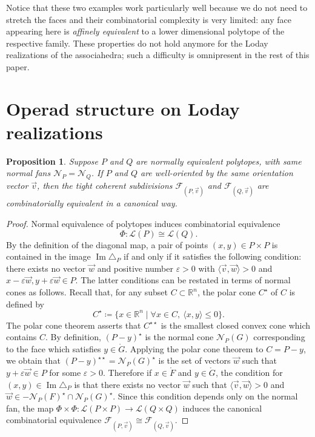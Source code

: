 \documentclass[JEP,XML,SOM,Unicode,NoFloatCountersInSection]{cedram}
\let\mathcal\mathscr
\theoremstyle{plain}
\newtheorem{proposition}{Proposition}
\theoremstyle{definition}
\newcommand{\RR}{\mathbb{R}}
\newcommand{\La}{\mathcal{L}}
\newcommand{\sF}{\mathcal{F}}
\newcommand{\ang}[1]{\langle #1\rangle}
\renewcommand{\No}{\mathcal{N}}
\DeclareMathOperator{\im}{\mathrm{Im}}
\begin{document}
Notice that these two examples work particularly well because we do not need to stretch the faces and their combinatorial complexity is very limited: any face appearing here is \emph{affinely equivalent} to a lower dimensional polytope of the respective family. These properties do not hold anymore for the Loday realizations of the associahedra; such a difficulty is omnipresent in the rest of this paper.

\section{Operad structure on Loday realizations}

\begin{proposition}\label{Prop:NormalFan}
Suppose $P$ and $Q$ are normally equivalent polytopes,
\ie with same normal fans $\No_P=\No_Q$.
If $P$ and $Q$ are well-oriented by the same orientation vector $\vec v$,
then the tight coherent subdivisions
$\sF_{(P, \vec v)}$ and $\sF_{(Q, \vec v)}$ are combinatorially equivalent in a canonical way.
\end{proposition}

\begin{proof}
Normal equivalence of polytopes induces combinatorial equivalence
\[
\Phi: \La(P)\cong\La(Q).
\]
By the definition of the diagonal map, a pair of points $(x, y)\in P\times P$ is contained in the image $\im \triangle_P$ if and only if it satisfies the following condition:
there exists no vector $\vec w$ and positive number $\varepsilon >0$ with $\ang{\vec v, \vec w}>0$ and $x-\varepsilon \vec w, y+\varepsilon\vec w\in P$.
The latter conditions can be restated in terms of normal cones as follows. Recall that,
for any subset $C \subset \RR^n$, the polar cone $C^\star$ of $C$ is defined by
\[
C^\star \coloneqq\{ x\in \RR^n\mid \forall x\in C, \ \ang{x, y} \leq 0\}.
\]
The polar cone theorem asserts that $C^{\star \star}$ is the smallest closed convex cone which contains $C$.
By definition, $(P-y)^\star$ is the normal cone $\No_P(G)$ corresponding to the face which satisfies $y\in \mathring G$.
Applying the polar cone theorem to $C= P-y$, we obtain that $(P-y)^{\star\star} = \No_P(G)^\star$ is the set of vectors $\vec w$ such that $y+\varepsilon\vec w \in P$ for some $\varepsilon >0$.
Therefore if $x\in \mathring F$ and $y\in \mathring G$, the condition for $(x, y)\in \im \triangle_P$ is that
there exists no vector $\vec w$ such that
$\ang{\vec v, \vec w}>0$ and $\vec w\in -\No_P(F)^\star\cap \No_P(G)^\star$.
Since this condition depends only on the normal fan,
the map $\Phi\times \Phi: \La(P\times P)\to \La(Q\times Q)$ induces the canonical combinatorial equivalence $\sF_{(P, \vec v)}\cong \sF_{(Q, \vec v)}$.
\end{proof}
\end{document}
